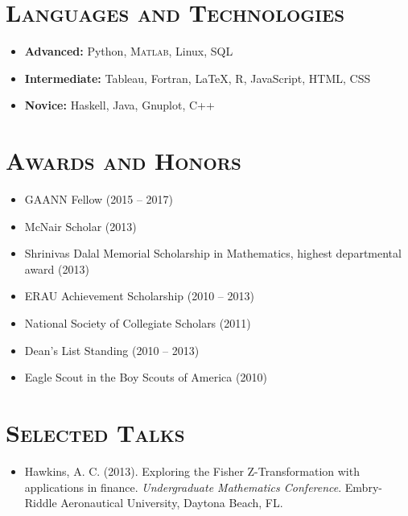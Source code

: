 \documentclass[10pt]{article}
\begin{document}
\section*{\textsc{Languages and Technologies}}
\begin{itemize}
    \item[] \textbf{Advanced:} Python, \textsc{Matlab}, Linux, SQL
    \item[] \textbf{Intermediate:} Tableau, Fortran, \LaTeX{}, \textsc{R}, JavaScript, HTML, CSS
    \item[] \textbf{Novice:} Haskell, Java, Gnuplot, \textsc{C++}
\end{itemize}

\section*{\textsc{Awards and Honors}}
\begin{itemize}
    \item GAANN Fellow (2015 -- 2017)
    \item McNair Scholar (2013)
    \item Shrinivas Dalal Memorial Scholarship in Mathematics, highest departmental award (2013)
    \item ERAU Achievement Scholarship (2010 -- 2013)
    \item National Society of Collegiate Scholars (2011)
    \item Dean's List Standing (2010 -- 2013)
    \item Eagle Scout in the Boy Scouts of America (2010)
\end{itemize}

\section*{\textsc{Selected Talks}}
\begin{itemize}[leftmargin=*]
    \item[] Hawkins, A. C. (2013). Exploring the Fisher Z-Transformation with applications in finance. \textit{Undergraduate Mathematics Conference}. Embry-Riddle Aeronautical University, Daytona Beach, FL.
\end{itemize}
\end{document}
